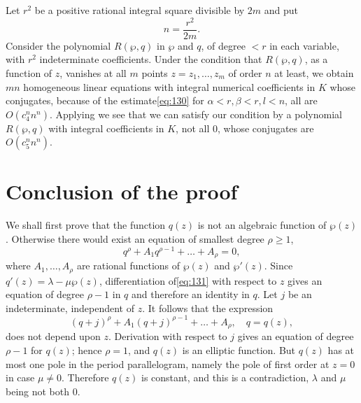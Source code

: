 Let $r^2$ be a positive rational integral square divisible by $2m$ and put
\[
n = \frac{r^2}{2m}.
\]
Consider the polynomial $R(\wp, q)$ in $\wp$ and $q$, of degree $< r$ in each variable, with $r^2$ indeterminate coefficients. Under the condition that $R(\wp, q)$, as a function of $z$, vanishes at all $m$ points $z = z_1, \dots, z_m$ of order $n$ at least, we obtain $mn$ homogeneous linear equations with integral numerical coefficients in $K$ whose conjugates, because of the estimate\eqref{eq:130} for $\alpha < r, \beta < r, l < n$, all are $O(c_4^n n^n)$. Applying we see that we can satisfy our condition by a polynomial $R(\wp, q)$ with integral coefficients in $K$, not all $0$, whose conjugates are $O(c_5^n n^n)$.

\section{Conclusion of the proof}\label{sec:4.4}

We shall first prove that the function $q(z)$ is not an algebraic function of $\wp(z)$. Otherwise there would exist an equation of smallest degree $\rho \ge 1$,
\begin{equation}
q^{\rho} + A_1 q^{\rho-1} + \dots + A_{\rho} = 0, \tag{131}\label{eq:131}
\end{equation}
where $A_1, \dots, A_\rho$ are rational functions of $\wp(z)$ and $\wp'(z)$. Since $q'(z) = \lambda - \mu \wp(z)$, differentiation of\eqref{eq:131} with respect to $z$ gives an equation of degree $\rho - 1$ in $q$ and therefore an identity in $q$. Let $j$ be an indeterminate, independent of $z$. It follows that the expression
\[
(q+j)^{\rho} + A_1(q+j)^{\rho-1} + \dots + A_{\rho}, \quad q=q(z),
\]
does not depend upon $z$. Derivation with respect to $j$ gives an equation of degree $\rho - 1$ for $q(z)$; hence $\rho = 1$, and $q(z)$ is an elliptic function. But $q(z)$ has at most one pole in the period parallelogram, namely the pole of first order at $z=0$ in case $\mu \neq 0$. Therefore $q(z)$ is constant, and this is a contradiction, $\lambda$ and $\mu$ being not both $0$.

